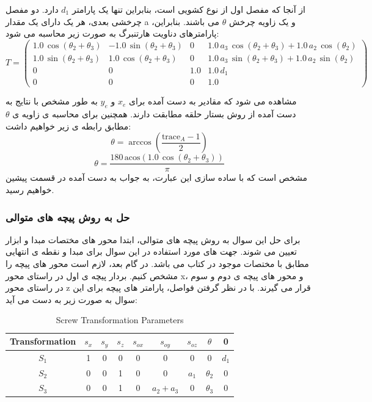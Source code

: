 از آنجا که مفصل اول از نوع کشویی است، بنابراین تنها یک پارامتر $d_1$ دارد. دو مفصل چرخشی بعدی، هر یک دارای یک مقدار a و یک زاویه چرخش $\theta$ می باشند. بنابراین، پارامترهای دناویت هارتنبرگ به صورت زیر محاسبه می شود:
\[
T = \left(\begin{array}{cccc}
	1.0\,\cos \left(\theta_2 +\theta_3 \right) & -1.0\,\sin \left(\theta_2 +\theta_3 \right) & 0 & 1.0\,a_3 \,\cos \left(\theta_2 +\theta_3 \right)+1.0\,a_2 \,\cos \left(\theta_2 \right)\\
	1.0\,\sin \left(\theta_2 +\theta_3 \right) & 1.0\,\cos \left(\theta_2 +\theta_3 \right) & 0 & 1.0\,a_3 \,\sin \left(\theta_2 +\theta_3 \right)+1.0\,a_2 \,\sin \left(\theta_2 \right)\\
	0 & 0 & 1.0 & 1.0\,d_1 \\
	0 & 0 & 0 & 1.0
\end{array}\right)
\]

مشاهده می شود که مقادیر به دست آمده برای $x_e$ و $y_e$ به طور مشخص با نتایج به دست آمده از روش بستار حلقه مطابقت دارند. 
همچنین برای محاسبه ی زاویه ی $\theta$ مطابق رابطه ی زیر خواهیم داشت:
\[
\theta = \arccos\left(\frac{\text{trace}_A - 1}{2}\right)  %
\]
\[
\theta = \frac{180\,\mathrm{acos}\left(1.0\,\cos \left(\theta_2 +\theta_3 \right)\right)}{\pi }
\]
مشخص است که با ساده سازی این عبارت، به جواب به دست آمده در قسمت پیشین خواهیم رسید.

 \subsubsection{حل به روش پیچه های متوالی}

برای حل این سوال به روش پیچه های متوالی، ابتدا محور های مختصات مبدا و ابزار تعیین می شوند. جهت های مورد استفاده در این سوال برای مبدا و نقطه ی انتهایی مطابق با مختصات موجود در کتاب می باشد.
در گام بعد، لازم است محور های پیچه را مشخص کنیم.
بردار پیچه ی اول در راستای محور x، و محور های پیچه ی دوم و سوم در راستای محور z قرار می گیرند. با در نظر گرفتن فواصل، پارامتر های پیچه برای این سوال به صورت زیر به دست می آید:

\begin{table}[h!]
	\centering
	\renewcommand{\arraystretch}{1.5}
	\begin{tabular}{|c|c|c|c|c|c|c|c|c|}
		\hline
		Transformation & \( s_x \) & \( s_y \) & \( s_z \) & \( s_{ox} \) & \( s_{oy} \) & \( s_{oz} \) & \( \theta \) & 0 \\ \hline
		\( S_1 \) & 1 & 0 & 0 & 0 & 0 & 0 & 0 & \( d_1 \) \\ \hline
		\( S_2 \) & 0 & 0 & 1 & 0 & 0 & \( a_1 \) & \( \theta_2 \) & 0 \\ \hline
		\( S_3 \) & 0 & 0 & 1 & 0 & \( a_2 + a_3 \) & 0 & \( \theta_3 \) & 0 \\ \hline
	\end{tabular}
	\caption{Screw Transformation Parameters}
\end{table}
 
